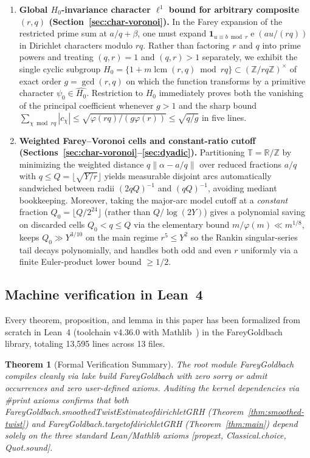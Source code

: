 \documentclass[11pt,reqno]{amsart}
\numberwithin{equation}{section}
\newtheorem{theorem}{Theorem}[section]
\theoremstyle{definition}
\newcommand{\R}{\mathbb{R}}
\newcommand{\Z}{\mathbb{Z}}
\newcommand{\T}{\mathbb{T}}
\newcommand{\1}{\mathbf{1}}
\newcommand{\e}{\operatorname{e}}
\DeclareMathOperator{\lcm}{lcm}
\newcommand{\lean}[1]{{\footnotesize\ttfamily\renewcommand{\_}{\textunderscore\allowbreak}#1}}
\begin{document}
\begin{enumerate}[label=(\arabic*),leftmargin=2em]
  \item \textbf{Global $H_0$-invariance character $\ell^1$ bound for arbitrary composite $(r,q)$ (Section~\ref{sec:char-voronoi}).}
  In the Farey expansion of the restricted prime sum at $a/q + \beta$, one must expand $\1_{u \equiv b \bmod r}\e(au/(rq))$ in Dirichlet characters modulo $rq$. Rather than factoring $r$ and $q$ into prime powers and treating $(q,r)=1$ and $(q,r)>1$ separately, we exhibit the single cyclic subgroup $H_0 = \{1 + m\lcm(r,q) \bmod rq\} \subset (\Z/rq\Z)^\times$ of exact order $g = \gcd(r,q)$ on which the function transforms by a primitive character $\psi_0 \in \widehat{H_0}$. Restriction to $H_0$ immediately proves both the vanishing of the principal coefficient whenever $g > 1$ and the sharp bound $\sum_{\chi \bmod rq} |c_\chi| \le \sqrt{\varphi(rq)/(g\varphi(r))} \le \sqrt{q/g}$ in five lines.

  \item \textbf{Weighted Farey--Voronoi cells and constant-ratio cutoff (Sections~\ref{sec:char-voronoi}--\ref{sec:dyadic}).}
  Partitioning $\T = \R/\Z$ by minimizing the weighted distance $q\|\alpha - a/q\|$ over reduced fractions $a/q$ with $q \le Q = \lfloor\sqrt{Y/r}\rfloor$ yields measurable disjoint arcs automatically sandwiched between radii $(2qQ)^{-1}$ and $(qQ)^{-1}$, avoiding mediant bookkeeping. Moreover, taking the major-arc model cutoff at a \emph{constant} fraction $Q_0 = \lfloor Q/2^{24}\rfloor$ (rather than $Q/\log(2Y)$) gives a polynomial saving on discarded cells $Q_0 < q \le Q$ via the elementary bound $m/\varphi(m) \ll m^{1/8}$, keeps $Q_0 \gg Y^{3/10}$ on the main regime $r^5 \le Y^2$ so the Rankin singular-series tail decays polynomially, and handles both odd and even $r$ uniformly via a finite Euler-product lower bound $\ge 1/2$.
\end{enumerate}

\subsection{Machine verification in Lean~4}
Every theorem, proposition, and lemma in this paper has been formalized from scratch in Lean~4 (toolchain \lean{v4.36.0} with Mathlib~\cite{deMouraUllrich2021,Mathlib2020}) in the \lean{FareyGoldbach} library, totaling 13{,}595 lines across 13 files.

\begin{theorem}[Formal Verification Summary]
\label{thm:formalization}
The root module \lean{FareyGoldbach} compiles cleanly via \lean{lake build FareyGoldbach} with zero \lean{sorry} or \lean{admit} occurrences and zero user-defined axioms. Auditing the kernel dependencies via \lean{\#print axioms} confirms that both \lean{FareyGoldbach.\allowbreak smoothedTwistEstimate\_of\_dirichletGRH} (Theorem~\ref{thm:smoothed-twist}) and \lean{FareyGoldbach.\allowbreak target\_of\_dirichletGRH} (Theorem~\ref{thm:main}) depend solely on the three standard Lean/Mathlib axioms \lean{[propext, Classical.choice, Quot.sound]}.
\end{theorem}
\end{document}
